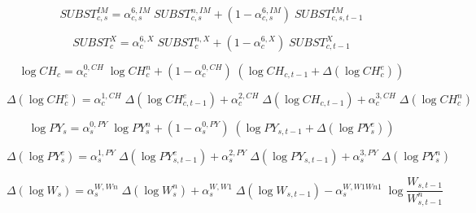 \documentclass[12pt]{article}
\numberwithin{equation}{section}
\begin{document}
\begin{dmath}
SUBST^{IM}_{c, s} = \alpha^{{6},IM}_{c, s} \; SUBST^{n,IM}_{c, s} + \left( 1 - \alpha^{{6},IM}_{c, s} \right) \; SUBST^{IM}_{c, s, t-1}
\end{dmath}

\begin{dmath}
SUBST^{X}_{c} = \alpha^{{6},X}_{c} \; SUBST^{n,X}_{c} + \left( 1 - \alpha^{{6},X}_{c} \right) \; SUBST^{X}_{c, t-1}
\end{dmath}



\begin{dmath}
\operatorname{log} CH_{c} = \alpha^{{0},CH}_{c} \; \operatorname{log} CH^{n}_{c} + \left( 1 - \alpha^{{0},CH}_{c} \right) \; \left( \operatorname{log} CH_{c, t-1} + \varDelta \left(\operatorname{log} CH^{e}_{c}\right) \right)
\end{dmath}

\begin{dmath}
\varDelta \left(\operatorname{log} CH^{e}_{c}\right) = \alpha^{{1},CH}_{c} \; \varDelta \left(\operatorname{log} CH^{e}_{c, t-1}\right) + \alpha^{{2},CH}_{c} \; \varDelta \left(\operatorname{log} CH_{c, t-1}\right) + \alpha^{{3},CH}_{c} \; \varDelta \left(\operatorname{log} CH^{n}_{c}\right)
\end{dmath}

\begin{dmath}
\operatorname{log} PY_{s} = \alpha^{{0},PY}_{s} \; \operatorname{log} PY^{n}_{s} + \left( 1 - \alpha^{{0},PY}_{s} \right) \; \left( \operatorname{log} PY_{s, t-1} + \varDelta \left(\operatorname{log} PY^{e}_{s}\right) \right)
\end{dmath}

\begin{dmath}
\varDelta \left(\operatorname{log} PY^{e}_{s}\right) = \alpha^{{1},PY}_{s} \; \varDelta \left(\operatorname{log} PY^{e}_{s, t-1}\right) + \alpha^{{2},PY}_{s} \; \varDelta \left(\operatorname{log} PY_{s, t-1}\right) + \alpha^{{3},PY}_{s} \; \varDelta \left(\operatorname{log} PY^{n}_{s}\right)
\end{dmath}



\begin{dmath}
\varDelta \left(\operatorname{log} W_{s}\right) = \alpha^{W,Wn}_{s} \; \varDelta \left(\operatorname{log} W^{n}_{s}\right) + \alpha^{W,W1}_{s} \; \varDelta \left(\operatorname{log} W_{s, t-1}\right) - \alpha^{W,W1Wn1}_{s} \; \operatorname{log} \frac{W_{s, t-1}}{W^{n}_{s, t-1}}
\end{dmath}
\end{document}
